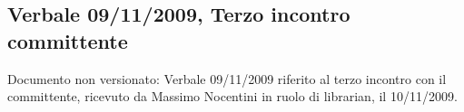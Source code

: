 \subsection{Verbale 09/11/2009, Terzo incontro committente}
Documento non versionato: Verbale 09/11/2009 riferito al terzo incontro con il 
committente, ricevuto da Massimo Nocentini in ruolo di librarian, il 10/11/2009.